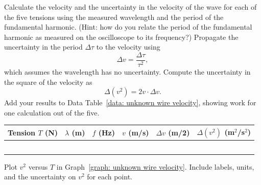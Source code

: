 \documentclass[addpoints]{physlabs}
\begin{document}
\begin{postlab}
    \filbreak
    \question[3] Calculate the velocity and the uncertainty in the velocity of the wave for each of the five tensions using the measured wavelength and the period of the fundamental harmonic. (Hint: how do you relate the period of the fundamental harmonic as measured on the oscilloscope to its frequency?) Propagate the uncertainty in the period $\Delta\tau$ to the velocity using
    \[
        \Delta v=\frac{\Delta\tau}{\tau^2},
    \]
    which assumes the wavelength has no uncertainty. Compute the uncertainty in the square of the velocity as
    \[
        \Delta(v^2) = 2v\cdot\Delta v.
    \]
    Add your results to Data Table~\ref{data: unknown wire velocity}, showing work for one calculation out of the five.

    \begin{center}
        \captionsetup{font=normalsize}
        \renewcommand{\arraystretch}{2}
        \begin{tabular}{|>{\centering\arraybackslash}p{2.25cm}|>{\centering\arraybackslash}p{2.25cm}|>{\centering\arraybackslash}p{2.25cm}|>{\centering\arraybackslash}p{2.25cm}|>{\centering\arraybackslash}p{2.25cm}|>{\centering\arraybackslash}p{2.25cm}|}
        \hline
        \rowcolor{gray!20}
        Tension $T$ (N) & $\lambda$ (m) & $f$ (Hz) & $v$ (m/s) & $\Delta v$ (m/2) & $\Delta (v^2)$ (m$^2$/s$^2$)
        \\
        \hline
        & & & & & \\ \hline
        & & & & & \\ \hline
        & & & & & \\ \hline
        & & & & & \\ \hline
        & & & & & \\ \hline
        \end{tabular}
    \end{center}

    \begin{solution}[4cm]
        
    \end{solution}

    \filbreak
    \question[3] Plot $v^2$ versus $T$ in Graph~\ref{graph: unknown wire velocity}. Include labels, units, and the uncertainty on $v^2$ for each point.


\end{postlab}
\end{document}
